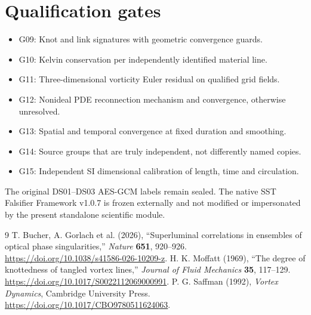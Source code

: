 \documentclass[11pt,a4paper]{article}
\begin{document}
\section{Qualification gates}
\begin{itemize}
\item G09: Knot and link signatures with geometric convergence guards.
\item G10: Kelvin conservation per independently identified material line.
\item G11: Three-dimensional vorticity Euler residual on qualified grid fields.
\item G12: Nonideal PDE reconnection mechanism and convergence, otherwise unresolved.
\item G13: Spatial and temporal convergence at fixed duration and smoothing.
\item G14: Source groups that are truly independent, not differently named copies.
\item G15: Independent SI dimensional calibration of length, time and circulation.
\end{itemize}
\noindent The original DS01--DS03 AES-GCM labels remain sealed. The native
SST Falsifier Framework v1.0.7 is frozen externally and not modified or
impersonated by the present standalone scientific module.
\begin{thebibliography}{9}
T. Bucher, A. Gorlach et al. (2026),
``Superluminal correlations in ensembles of optical phase singularities,''
\emph{Nature} \textbf{651}, 920--926.
\url{https://doi.org/10.1038/s41586-026-10209-z}.
H. K. Moffatt (1969), ``The degree of knottedness of tangled vortex lines,''
\emph{Journal of Fluid Mechanics} \textbf{35}, 117--129.
\url{https://doi.org/10.1017/S0022112069000991}.
P. G. Saffman (1992), \emph{Vortex Dynamics}, Cambridge University Press.
\url{https://doi.org/10.1017/CBO9780511624063}.
\end{thebibliography}
\end{document}
